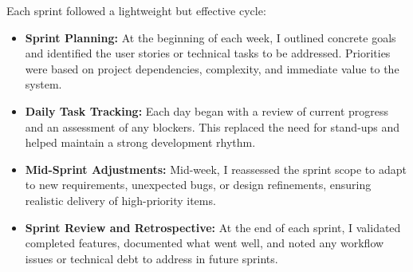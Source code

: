 \documentclass[12pt,a4paper]{report} %
\begin{document}
Each sprint followed a lightweight but effective cycle:

\begin{itemize}
    \item \textbf{Sprint Planning:} At the beginning of each week, I outlined concrete goals and identified the user stories or technical tasks to be addressed. Priorities were based on project dependencies, complexity, and immediate value to the system.
    \item \textbf{Daily Task Tracking:} Each day began with a review of current progress and an assessment of any blockers. This replaced the need for stand-ups and helped maintain a strong development rhythm.
    \item \textbf{Mid-Sprint Adjustments:} Mid-week, I reassessed the sprint scope to adapt to new requirements, unexpected bugs, or design refinements, ensuring realistic delivery of high-priority items.
    \item \textbf{Sprint Review and Retrospective:} At the end of each sprint, I validated completed features, documented what went well, and noted any workflow issues or technical debt to address in future sprints.
\end{itemize}
\end{document}
